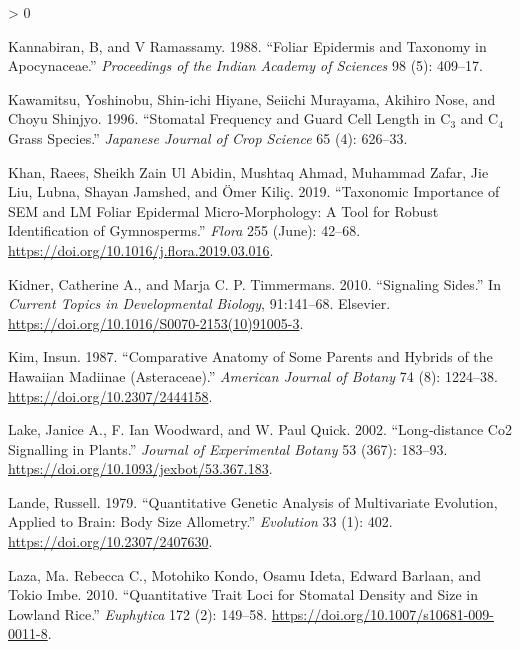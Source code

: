 \documentclass[
  10pt,
]{article}
\newlength{\cslhangindent}
\newenvironment{CSLReferences}[2] %
 {%
  \setlength{\parindent}{0pt}
  \ifodd #1 \everypar{\setlength{\hangindent}{\cslhangindent}}\ignorespaces\fi
  \ifnum #2 > 0
  \setlength{\parskip}{#2\baselineskip}
  \fi
 }%
 {}
\begin{document}
\begin{CSLReferences}{1}{0}
\leavevmode\hypertarget{ref-kannabiran_foliar_1988}{}%
Kannabiran, B, and V Ramassamy. 1988. {``Foliar Epidermis and Taxonomy in {Apocynaceae}.''} \emph{Proceedings of the Indian Academy of Sciences} 98 (5): 409--17.

\leavevmode\hypertarget{ref-kawamitsu_stomatal_1996}{}%
Kawamitsu, Yoshinobu, Shin-ichi Hiyane, Seiichi Murayama, Akihiro Nose, and Choyu Shinjyo. 1996. {``Stomatal Frequency and Guard Cell Length in {C}\(_{\textrm{3}}\) and {C}\(_{\textrm{4}}\) Grass Species.''} \emph{Japanese Journal of Crop Science} 65 (4): 626--33.

\leavevmode\hypertarget{ref-khan_taxonomic_2019}{}%
Khan, Raees, Sheikh Zain Ul Abidin, Mushtaq Ahmad, Muhammad Zafar, Jie Liu, Lubna, Shayan Jamshed, and Ömer Kiliç. 2019. {``Taxonomic Importance of {SEM} and {LM} Foliar Epidermal Micro-Morphology: {A} Tool for Robust Identification of Gymnosperms.''} \emph{Flora} 255 (June): 42--68. \url{https://doi.org/10.1016/j.flora.2019.03.016}.

\leavevmode\hypertarget{ref-kidner_signaling_2010}{}%
Kidner, Catherine A., and Marja C. P. Timmermans. 2010. {``Signaling {Sides}.''} In \emph{Current {Topics} in {Developmental} {Biology}}, 91:141--68. Elsevier. \url{https://doi.org/10.1016/S0070-2153(10)91005-3}.

\leavevmode\hypertarget{ref-kim_comparative_1987}{}%
Kim, Insun. 1987. {``Comparative {Anatomy} of {Some} {Parents} and {Hybrids} of the {Hawaiian} {Madiinae} ({Asteraceae}).''} \emph{American Journal of Botany} 74 (8): 1224--38. \url{https://doi.org/10.2307/2444158}.

\leavevmode\hypertarget{ref-lake_longdistance_2002}{}%
Lake, Janice A., F. Ian Woodward, and W. Paul Quick. 2002. {``Long‐distance {Co2} Signalling in Plants.''} \emph{Journal of Experimental Botany} 53 (367): 183--93. \url{https://doi.org/10.1093/jexbot/53.367.183}.

\leavevmode\hypertarget{ref-lande_quantitative_1979}{}%
Lande, Russell. 1979. {``Quantitative {Genetic} {Analysis} of {Multivariate} {Evolution}, {Applied} to {Brain}: {Body} {Size} {Allometry}.''} \emph{Evolution} 33 (1): 402. \url{https://doi.org/10.2307/2407630}.

\leavevmode\hypertarget{ref-laza_quantitative_2010}{}%
Laza, Ma. Rebecca C., Motohiko Kondo, Osamu Ideta, Edward Barlaan, and Tokio Imbe. 2010. {``Quantitative Trait Loci for Stomatal Density and Size in Lowland Rice.''} \emph{Euphytica} 172 (2): 149--58. \url{https://doi.org/10.1007/s10681-009-0011-8}.


\end{CSLReferences}
\end{document}
